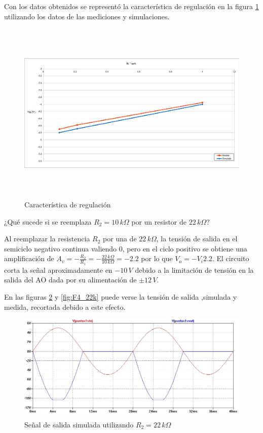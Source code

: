 \documentclass[10pt,spanish,a4paper,openany,notitlepage]{article}
\begin{document}
Con los datos obtenidos se representó la característica de regulación en la figura \ref{fig:F4_caracteristica_regulacion} utilizando los datos de las mediciones y simulaciones.

\begin{figure}[H]
\centering
\includegraphics[width=350pt, height=250pt]{mediciones/F4.jpg}
\caption{Característica de regulación}
\label{fig:F4_caracteristica_regulacion}
\end{figure}



{\color{OliveGreen} ¿Qué sucede si se reemplaza $R_2 = 10\,\unit{k\Omega}$
por un resistor de $22\,\unit{k\Omega}$?}


Al reemplazar la resistencia $R_2$ por una de $22\,\unit{k\Omega}$, la tensión de salida en el semiciclo negativo continua valiendo 0, pero en el ciclo positivo
se obtiene una amplificación de $A_v = -\frac{R_2}{R_1} = -\frac{22\,\unit{k\Omega}}{10\,\unit{k\Omega}} = -2.2$ por lo que $V_o=-V_i 2.2$. El circuito corta la señal aproximadamente en $-10\,\unit{V}$ debido a la limitación de tensión en la salida del AO dada por su alimentación de $\pm 12\, \unit{V}$.


En las figuras \ref{fig:F4_22k_sim} y \ref{fig:F4_22k} puede verse la tensión de salida ,simulada y medida, recortada debido a este efecto.


\begin{figure}[H]
\centering
\includegraphics[scale = 0.65]{simulaciones/F4_22k_sim.jpg}
\caption{Señal de salida simulada utilizando $R_2 = 22\,\unit{k\Omega}$}
\label{fig:F4_22k_sim}
\end{figure}
\end{document}
